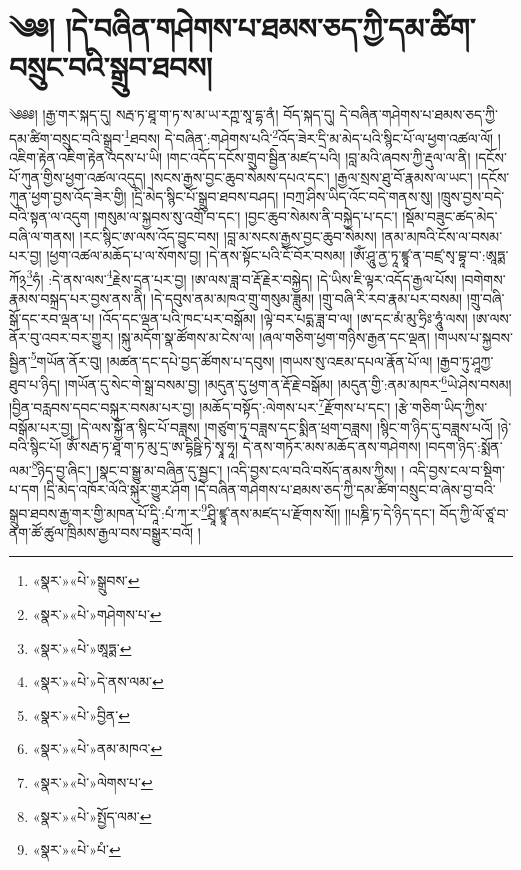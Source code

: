 \chapter{༄༅། །དེ་བཞིན་གཤེགས་པ་ཐམས་ཅད་ཀྱི་དམ་ཚིག་བསྲུང་བའི་སྒྲུབ་ཐབས།}༄༅༅། །རྒྱ་གར་སྐད་དུ། སརྦ་ཏ་ཐཱ་ག་ཏ་ས་མ་ཡ་རཀྵ་སཱ་དྷ་ནཾ། བོད་སྐད་དུ། དེ་བཞིན་གཤེགས་པ་ཐམས་ཅད་ཀྱི་དམ་ཚིག་བསྲུང་བའི་སྒྲུབ་\footnote{«སྣར་»«པེ་»སྒྲུབས་}ཐབས། དེ་བཞིན་:གཤེགས་པའི་\footnote{«སྣར་»«པེ་»གཤེགས་པ་}འོད་ཟེར་དྲི་མ་མེད་པའི་སྙིང་པོ་ལ་ཕྱག་འཚལ་ལོ། །འཇིག་རྟེན་འཇིག་རྟེན་འདས་པ་ཡི། །གང་འདོད་དངོས་གྲུབ་སྦྱིན་མཛད་པའི། །བླ་མའི་ཞབས་ཀྱི་རྡུལ་ལ་ནི། །དངོས་པོ་ཀུན་གྱིས་ཕྱག་འཚལ་འདུད། །སངས་རྒྱས་བྱང་ཆུབ་སེམས་དཔའ་དང་། །རྒྱལ་སྲས་ཐུ་བོ་རྣམས་ལ་ཡང་། །དངོས་ཀུན་ཕྱག་བྱས་འོད་ཟེར་གྱི། །དྲི་མེད་སྙིང་པོ་སྒྲུབ་ཐབས་བཤད། །བཀྲ་ཤིས་ཡིད་འོང་བདེ་གནས་སུ། །ཁྲུས་བྱས་བདེ་བའི་སྟན་ལ་འདུག །གསུམ་ལ་སྐྱབས་སུ་འགྲོ་བ་དང་། །བྱང་ཆུབ་སེམས་ནི་བསྐྱེད་པ་དང་། །སྡོམ་བཟུང་ཚད་མེད་བཞི་ལ་གནས། །རང་སྙིང་ཨ་ལས་འོད་བྱུང་བས། །བླ་མ་སངས་རྒྱས་བྱང་ཆུབ་སེམས། །ནམ་མཁའི་ངོས་ལ་བསམ་པར་བྱ། །ཕྱག་འཚལ་མཆོད་པ་ལ་སོགས་བྱ། །དེ་ནས་སྟོང་པའི་ངོ་བོར་བསམ། །ཨོཾ་ཤཱུ་ནྱ་ཏཱ་ཛྙཱ་ན་བཛྲ་སྭ་བྷཱ་བ་:ཨཱཏྨ་ཀོ྅\footnote{«སྣར་»«པེ་»ཨཱཏྨ་}ཧཾ། :དེ་ནས་ལས་\footnote{«སྣར་»«པེ་»དེ་ནས་ལམ་}རྗེས་དྲན་པར་བྱ། །ཨ་ལས་ཟླ་བ་རྡོ་རྗེར་བསྐྱེད། །དེ་ཡིས་ཇི་ལྟར་འདོད་རྒྱལ་པོས། །བགེགས་རྣམས་བསྐྲད་པར་བྱས་ནས་ནི། །དེ་དབུས་ནམ་མཁའ་གྲུ་གསུམ་ཟླུམ། །གྲུ་བཞི་རི་རབ་རྣམ་པར་བསམ། །གྲུ་བཞི་སྒོ་དང་རབ་ལྡན་པ། །འོད་དང་ལྡན་པའི་ཁང་པར་བསྒོམ། །ལྟེ་བར་པདྨ་ཟླ་བ་ལ། །ཨ་དང་མཾ་མུ་ཧྲིཿ་ཧཱུཾ་ལས། །ཨ་ལས་ནོར་བུ་འབར་བར་གྱུར། །སྐུ་མདོག་སྣ་ཚོགས་མ་ངེས་ལ། །ཞལ་གཅིག་ཕྱག་གཉིས་རྒྱན་དང་ལྡན། །གཡས་པ་སྐྱབས་སྦྱིན་\footnote{«སྣར་»«པེ་»བྱིན་}གཡོན་ནོར་བུ། །མཚན་དང་དཔེ་བྱད་ཚོགས་པ་དབུས། །གཡས་སུ་འཇམ་དཔལ་རྣོན་པོ་ལ། །རྒྱབ་ཏུ་ཤཱཀྱ་ཐུབ་པ་ཉིད། །གཡོན་དུ་སེང་གེ་སྒྲ་བསམ་བྱ། །མདུན་དུ་ཕྱག་ན་རྡོ་རྗེ་བསྒོམ། །མདུན་གྱི་:ནམ་མཁར་\footnote{«སྣར་»«པེ་»ནམ་མཁའ་}ཡེ་ཤེས་བསམ། །བྱིན་བརླབས་དབང་བསྐུར་བསམ་པར་བྱ། །མཆོད་བསྟོད་:ལེགས་པར་\footnote{«སྣར་»«པེ་»ལེགས་པ་}རྫོགས་པ་དང་། །རྩེ་གཅིག་ཡིད་ཀྱིས་བསྒོམ་པར་བྱ། །དེ་ལས་སྐྱོ་ན་སྙིང་པོ་བཟླས། །གཙུག་ཏུ་བཟླས་དང་སྨིན་ཕྲག་བཟླས། །སྙིང་ག་ཉིད་དུ་བཟླས་པའོ། །ཉེ་བའི་སྙིང་པོ། ཨོཾ་སརྦ་ཏ་ཐཱ་ག་ཏ་མུ་དྲ་ཨ་དྷིཥྛི་ཏེ་སྭཱ་ཧཱ། དེ་ནས་གཏོར་མས་མཆོད་ནས་གཤེགས། །བདག་ཉིད་:སྨོན་ལམ་\footnote{«སྣར་»«པེ་»སྤྱོད་ལམ་}ཉིད་བྱ་ཞིང་། །སྣང་བ་སྒྱུ་མ་བཞིན་དུ་སྦྱང་། །འདི་བྱས་ངལ་བའི་བསོད་ནམས་ཀྱིས། །
འདི་བྱས་ངལ་བ་སྡིག་པ་དག །དྲི་མེད་འཁོར་ལོའི་སྐུར་གྱུར་ཤོག །དེ་བཞིན་གཤེགས་པ་ཐམས་ཅད་ཀྱི་དམ་ཚིག་བསྲུང་བ་ཞེས་བྱ་བའི་སྒྲུབ་ཐབས་རྒྱ་གར་གྱི་མཁན་པོ་དཱི་:པཾ་ཀ་ར་\footnote{«སྣར་»«པེ་»པཾ་}ཤྲཱི་ཛྙཱ་ནས་མཛད་པ་རྫོགས་སོ།། །།པཎྜི་ཏ་དེ་ཉིད་དང་། བོད་ཀྱི་ལོ་ཙཱ་བ་ནག་ཚོ་ཚུལ་ཁྲིམས་རྒྱལ་བས་བསྒྱུར་བའོ། ། 